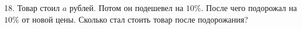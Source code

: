 18. Товар стоил $a$ рублей. Потом он подешевел на $10\%.$ После чего подорожал на $10\%$ от новой цены. Сколько стал стоить товар после подорожания?\\
